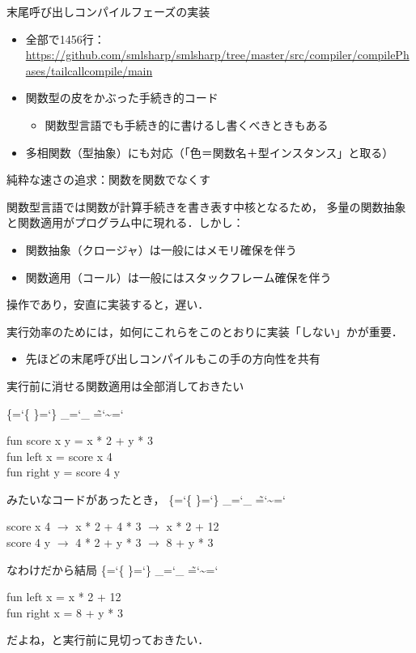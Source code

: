 \documentclass[aspectratio=169,t,dvipdfmx,12pt]{beamer}
\newcommand\codestyle{%
  \ttfamily
  \chardef\{=`\{
  \chardef\}=`\}
  \chardef\_=`\_
  \chardef\~=`\~
  \chardef\/=`\\
  \frenchspacing}
\newenvironment{prog}
  {\codestyle\begin{tabbing}}
  {\end{tabbing}}
\newcommand\KW[1]{{\color{KW}#1}}
\newcommand\ID[1]{{\color{ID}#1}}
\newcommand\PART[1]{%
  \begin{frame}
  \vfill\hfil\structure{\Large\bfseries #1}
  \end{frame}}
\begin{document}
\begin{frame}{末尾呼び出しコンパイルフェーズの実装}

\begin{itemize}
\item 全部で1456行：\url{https://github.com/smlsharp/smlsharp/tree/master/src/compiler/compilePhases/tailcallcompile/main}
\item 関数型の皮をかぶった手続き的コード
\begin{itemize}
\item 関数型言語でも手続き的に書けるし書くべきときもある
\end{itemize}
\item 多相関数（型抽象）にも対応（「色＝関数名＋型インスタンス」と取る）
\end{itemize}

\end{frame}

\PART{部分評価に基づくコードの最適化}

\begin{frame}{純粋な速さの追求：関数を関数でなくす}

関数型言語では関数が計算手続きを書き表す中核となるため，
多量の関数抽象と関数適用がプログラム中に現れる．しかし：
\begin{itemize}
\item 関数抽象（クロージャ）は一般にはメモリ確保を伴う
\item 関数適用（コール）は一般にはスタックフレーム確保を伴う
\end{itemize}
操作であり，安直に実装すると，遅い．

\bigskip

実行効率のためには，如何にこれらをこのとおりに実装「しない」かが重要．

\begin{itemize}
\item 先ほどの末尾呼び出しコンパイルもこの手の方向性を共有
\end{itemize}

\end{frame}

\begin{frame}{実行前に消せる関数適用は全部消しておきたい}

\begin{prog}
\KW{fun} \ID{score} x y = x * 2 + y * 3\\
\KW{fun} \ID{left} x = score x 4\\
\KW{fun} \ID{right} y = score 4 y
\end{prog}
みたいなコードがあったとき，
\begin{prog}
score x 4 $\longrightarrow$ x * 2 + 4 * 3 $\longrightarrow$ x * 2 + 12\\
score 4 y $\longrightarrow$ 4 * 2 + y * 3 $\longrightarrow$ 8 + y * 3
\end{prog}
なわけだから結局
\begin{prog}
\KW{fun} \ID{left} x = x * 2 + 12\\
\KW{fun} \ID{right} x = 8 + y * 3
\end{prog}
だよね，と実行前に見切っておきたい．

\end{frame}
\end{document}
